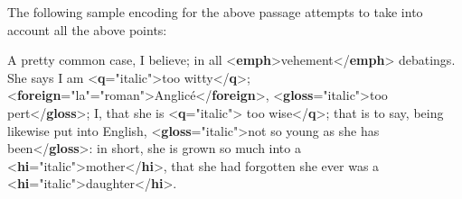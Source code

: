 The following sample encoding for the above passage attempts to take into account all the above points: \par\bgroup{}\exampleFont \begin{shaded}\noindent\mbox{}A pretty common case, I believe; in all {<\textbf{emph}>}vehement{</\textbf{emph}>}\mbox{}\newline 
 debatings. She says I am {<\textbf{q}\hspace*{1em}{rend}="{italic}">}too witty{</\textbf{q}>};\mbox{}\newline 
{<\textbf{foreign}\hspace*{1em}{xml:lang}="{la}"\hspace*{1em}{rend}="{roman}">}Anglicé{</\textbf{foreign}>},\mbox{}\newline 
{<\textbf{gloss}\hspace*{1em}{rend}="{italic}">}too pert{</\textbf{gloss}>}; I, that she is\mbox{}\newline 
{<\textbf{q}\hspace*{1em}{rend}="{italic}">} too wise{</\textbf{q}>}; that is to say, being likewise\mbox{}\newline 
 put into English, {<\textbf{gloss}\hspace*{1em}{rend}="{italic}">}not so young as she has\mbox{}\newline 
 been{</\textbf{gloss}>}: in short, she is grown so much into a\mbox{}\newline 
{<\textbf{hi}\hspace*{1em}{rend}="{italic}">}mother{</\textbf{hi}>}, that she had forgotten she ever\mbox{}\newline 
 was a {<\textbf{hi}\hspace*{1em}{rend}="{italic}">}daughter{</\textbf{hi}>}.\end{shaded}\egroup\par \noindent        
